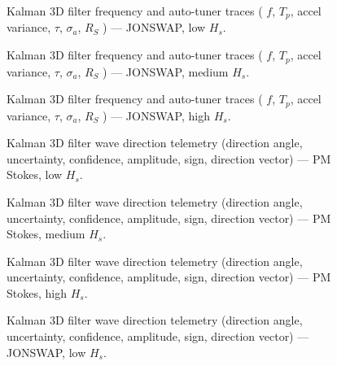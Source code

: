 \documentclass[11pt,letterpaper]{article}
\begin{document}
\begin{figure}[H]\centering
  \resizebox{\textwidth}{!}{}
  \caption{Kalman 3D filter frequency and auto-tuner traces ( $f$, $T_p$, accel variance, $\tau$, $\sigma_a$, $R_S$ ) — JONSWAP, low $H_s$.}
  \label{fig:w3d_jonswap_low_tuner}
\end{figure}

\begin{figure}[H]\centering
  \resizebox{\textwidth}{!}{}
  \caption{Kalman 3D filter frequency and auto-tuner traces ( $f$, $T_p$, accel variance, $\tau$, $\sigma_a$, $R_S$ ) — JONSWAP, medium $H_s$.}
  \label{fig:w3d_jonswap_medium_tuner}
\end{figure}

\begin{figure}[H]\centering
  \resizebox{\textwidth}{!}{}
  \caption{Kalman 3D filter frequency and auto-tuner traces ( $f$, $T_p$, accel variance, $\tau$, $\sigma_a$, $R_S$ ) — JONSWAP, high $H_s$.}
  \label{fig:w3d_jonswap_high_tuner}
\end{figure}



\begin{figure}[H]\centering
  \resizebox{\textwidth}{!}{}
  \caption{Kalman 3D filter wave direction telemetry (direction angle, uncertainty, confidence, amplitude, sign, direction vector) — PM Stokes, low $H_s$.}
  \label{fig:w3d_pmstokes_low_dir}
\end{figure}

\begin{figure}[H]\centering
  \resizebox{\textwidth}{!}{}
  \caption{Kalman 3D filter wave direction telemetry (direction angle, uncertainty, confidence, amplitude, sign, direction vector) — PM Stokes, medium $H_s$.}
  \label{fig:w3d_pmstokes_medium_dir}
\end{figure}

\begin{figure}[H]\centering
  \resizebox{\textwidth}{!}{}
  \caption{Kalman 3D filter wave direction telemetry (direction angle, uncertainty, confidence, amplitude, sign, direction vector) — PM Stokes, high $H_s$.}
  \label{fig:w3d_pmstokes_high_dir}
\end{figure}

\begin{figure}[H]\centering
  \resizebox{\textwidth}{!}{}
  \caption{Kalman 3D filter wave direction telemetry (direction angle, uncertainty, confidence, amplitude, sign, direction vector) — JONSWAP, low $H_s$.}
  \label{fig:w3d_jonswap_low_dir}
\end{figure}
\end{document}
